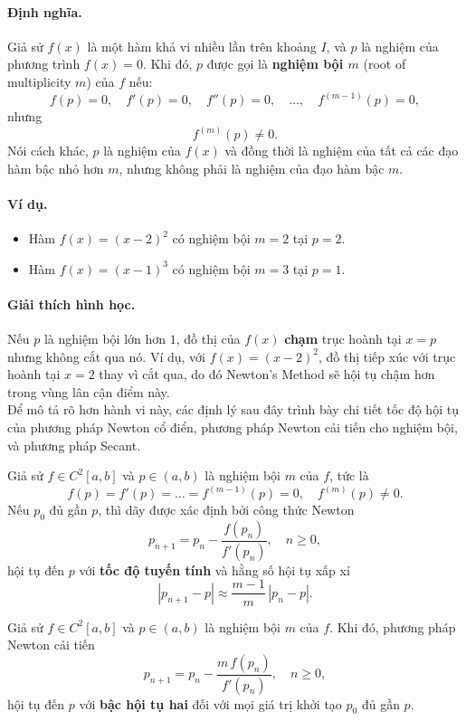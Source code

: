 \paragraph*{Định nghĩa.}
Giả sử $f(x)$ là một hàm khả vi nhiều lần trên khoảng $I$, và $p$ là nghiệm của phương trình $f(x) = 0$. 
Khi đó, $p$ được gọi là \textbf{nghiệm bội $m$} (root of multiplicity $m$) của $f$ 
nếu:
\[
    f(p) = 0, \quad f'(p) = 0, \quad f''(p) = 0, \quad \dots, \quad f^{(m-1)}(p) = 0,
\]
nhưng
\[
    f^{(m)}(p) \ne 0.
\]
Nói cách khác, $p$ là nghiệm của $f(x)$ và đồng thời là nghiệm của tất cả các đạo hàm bậc nhỏ hơn $m$, nhưng không phải là nghiệm của đạo hàm bậc $m$.

\paragraph*{Ví dụ.}
\begin{itemize}
    \item Hàm $f(x) = (x - 2)^2$ có nghiệm bội $m = 2$ tại $p = 2$.
    \item Hàm $f(x) = (x - 1)^3$ có nghiệm bội $m = 3$ tại $p = 1$.
\end{itemize}

\paragraph*{Giải thích hình học.}
Nếu $p$ là nghiệm bội lớn hơn $1$, đồ thị của $f(x)$ 
\textbf{chạm} trục hoành tại $x = p$ nhưng không cắt qua nó.  
Ví dụ, với $f(x) = (x - 2)^2$, 
đồ thị tiếp xúc với trục hoành tại $x=2$ thay vì cắt qua, do đó Newton’s Method sẽ hội tụ chậm hơn trong vùng lân cận điểm này.
\\
Để mô tả rõ hơn hành vi này, các định lý sau đây trình bày chi tiết tốc độ hội tụ của phương pháp Newton cổ điển, phương pháp Newton cải tiến cho nghiệm bội, và phương pháp Secant.

\begin{theorem}
Giả sử $f \in C^{2}[a,b]$ và $p \in (a,b)$ là nghiệm bội $m$ của $f$, tức là
\[
    f(p) = f'(p) = \dots = f^{(m-1)}(p) = 0, \quad f^{(m)}(p) \ne 0.
\]
Nếu $p_0$ đủ gần $p$, thì dãy được xác định bởi công thức Newton
\[
    p_{n+1} = p_n - \frac{f(p_n)}{f'(p_n)}, \quad n \ge 0,
\]
hội tụ đến $p$ với \textbf{tốc độ tuyến tính} và hằng số hội tụ xấp xỉ
\[
    |p_{n+1} - p| \approx \frac{m-1}{m}\,|p_n - p|.
\]
\end{theorem}

\begin{theorem}
Giả sử $f \in C^{2}[a,b]$ và $p \in (a,b)$ là nghiệm bội $m$ của $f$. 
Khi đó, phương pháp Newton cải tiến
\[
    p_{n+1} = p_n - \frac{m\, f(p_n)}{f'(p_n)}, \quad n \ge 0,
\]
hội tụ đến $p$ với \textbf{bậc hội tụ hai} đối với mọi giá trị khởi tạo $p_0$ đủ gần $p$.
\end{theorem}

